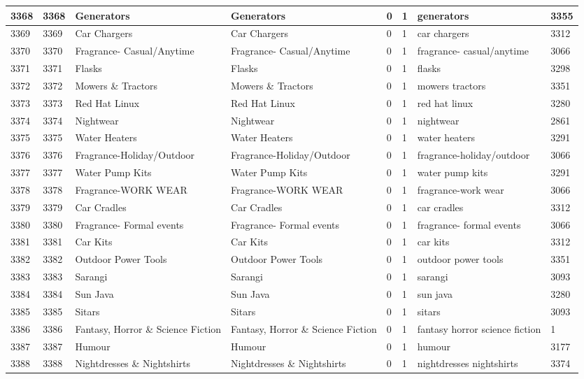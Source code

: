 \begin{longtable}{|l|l|l|l|l|l|l|l|}
3368 & 3368 & Generators & Generators & 0 & 1 & generators & 3355 \\ \hline 
3369 & 3369 & Car Chargers & Car Chargers & 0 & 1 & car chargers & 3312 \\ \hline 
3370 & 3370 & Fragrance- Casual/Anytime & Fragrance- Casual/Anytime & 0 & 1 & fragrance- casual/anytime & 3066 \\ \hline 
3371 & 3371 & Flasks & Flasks & 0 & 1 & flasks & 3298 \\ \hline 
3372 & 3372 & Mowers \& Tractors & Mowers \& Tractors & 0 & 1 & mowers tractors & 3351 \\ \hline 
3373 & 3373 & Red Hat Linux & Red Hat Linux & 0 & 1 & red hat linux & 3280 \\ \hline 
3374 & 3374 & Nightwear & Nightwear & 0 & 1 & nightwear & 2861 \\ \hline 
3375 & 3375 & Water Heaters & Water Heaters & 0 & 1 & water heaters & 3291 \\ \hline 
3376 & 3376 & Fragrance-Holiday/Outdoor & Fragrance-Holiday/Outdoor & 0 & 1 & fragrance-holiday/outdoor & 3066 \\ \hline 
3377 & 3377 & Water Pump Kits & Water Pump Kits & 0 & 1 & water pump kits & 3291 \\ \hline 
3378 & 3378 & Fragrance-WORK WEAR & Fragrance-WORK WEAR & 0 & 1 & fragrance-work wear & 3066 \\ \hline 
3379 & 3379 & Car Cradles & Car Cradles & 0 & 1 & car cradles & 3312 \\ \hline 
3380 & 3380 & Fragrance- Formal events & Fragrance- Formal events & 0 & 1 & fragrance- formal events & 3066 \\ \hline 
3381 & 3381 & Car Kits & Car Kits & 0 & 1 & car kits & 3312 \\ \hline 
3382 & 3382 & Outdoor Power Tools & Outdoor Power Tools & 0 & 1 & outdoor power tools & 3351 \\ \hline 
3383 & 3383 & Sarangi & Sarangi & 0 & 1 & sarangi & 3093 \\ \hline 
3384 & 3384 & Sun Java & Sun Java & 0 & 1 & sun java & 3280 \\ \hline 
3385 & 3385 & Sitars & Sitars & 0 & 1 & sitars & 3093 \\ \hline 
3386 & 3386 & Fantasy, Horror \& Science Fiction & Fantasy, Horror \& Science Fiction & 0 & 1 & fantasy horror science fiction & 1 \\ \hline 
3387 & 3387 & Humour & Humour & 0 & 1 & humour & 3177 \\ \hline 
3388 & 3388 & Nightdresses \& Nightshirts & Nightdresses \& Nightshirts & 0 & 1 & nightdresses nightshirts & 3374 \\ \hline 

\end{longtable}
